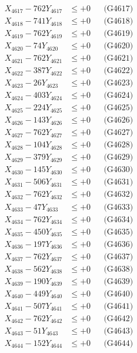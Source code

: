 \documentclass[a4paper,10pt]{article}
\begin{document}
{\begin{align}
X_{4617} - 762Y_{4617} &\leq +0 && \text{(G4617)} \\
X_{4618} - 741Y_{4618} &\leq +0 && \text{(G4618)} \\
X_{4619} - 762Y_{4619} &\leq +0 && \text{(G4619)} \\
X_{4620} - 74Y_{4620} &\leq +0 && \text{(G4620)} \\
\allowbreak
X_{4621} - 762Y_{4621} &\leq +0 && \text{(G4621)} \\
X_{4622} - 387Y_{4622} &\leq +0 && \text{(G4622)} \\
X_{4623} - 26Y_{4623} &\leq +0 && \text{(G4623)} \\
X_{4624} - 403Y_{4624} &\leq +0 && \text{(G4624)} \\
X_{4625} - 224Y_{4625} &\leq +0 && \text{(G4625)} \\
X_{4626} - 143Y_{4626} &\leq +0 && \text{(G4626)} \\
X_{4627} - 762Y_{4627} &\leq +0 && \text{(G4627)} \\
X_{4628} - 104Y_{4628} &\leq +0 && \text{(G4628)} \\
X_{4629} - 379Y_{4629} &\leq +0 && \text{(G4629)} \\
X_{4630} - 145Y_{4630} &\leq +0 && \text{(G4630)} \\
\allowbreak
X_{4631} - 506Y_{4631} &\leq +0 && \text{(G4631)} \\
X_{4632} - 762Y_{4632} &\leq +0 && \text{(G4632)} \\
X_{4633} - 47Y_{4633} &\leq +0 && \text{(G4633)} \\
X_{4634} - 762Y_{4634} &\leq +0 && \text{(G4634)} \\
X_{4635} - 450Y_{4635} &\leq +0 && \text{(G4635)} \\
X_{4636} - 197Y_{4636} &\leq +0 && \text{(G4636)} \\
X_{4637} - 762Y_{4637} &\leq +0 && \text{(G4637)} \\
X_{4638} - 562Y_{4638} &\leq +0 && \text{(G4638)} \\
X_{4639} - 190Y_{4639} &\leq +0 && \text{(G4639)} \\
X_{4640} - 449Y_{4640} &\leq +0 && \text{(G4640)} \\
\allowbreak
X_{4641} - 507Y_{4641} &\leq +0 && \text{(G4641)} \\
X_{4642} - 762Y_{4642} &\leq +0 && \text{(G4642)} \\
X_{4643} - 51Y_{4643} &\leq +0 && \text{(G4643)} \\
X_{4644} - 152Y_{4644} &\leq +0 && \text{(G4644)} \\

\end{align}}
\end{document}
